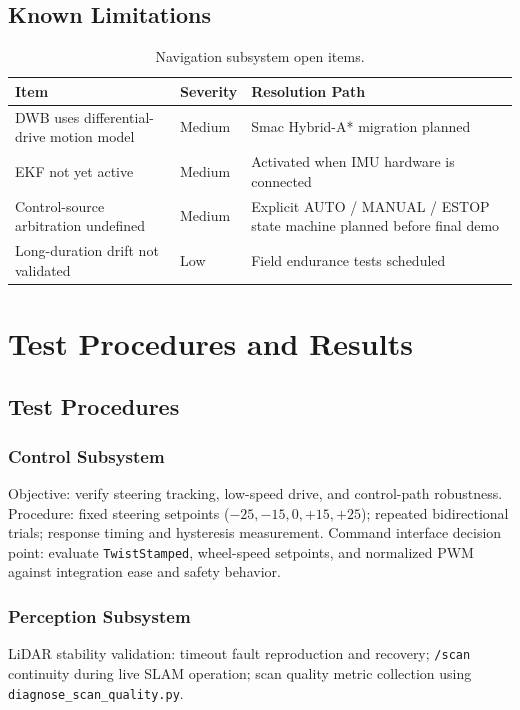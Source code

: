 \documentclass[12pt,a4paper]{report}
\begin{document}
\section{Known Limitations}

\begin{table}[H]
\centering
\caption{Navigation subsystem open items.}
\label{tab:nav_limits}
\begin{tabularx}{\textwidth}{|p{3.8cm}|p{1.4cm}|X|}
\hline
\textbf{Item} & \textbf{Severity} & \textbf{Resolution Path} \\
\hline
DWB uses differential-drive motion model & Medium & Smac Hybrid-A* migration planned \\
\hline
EKF not yet active & Medium & Activated when IMU hardware is connected \\
\hline
Control-source arbitration undefined & Medium & Explicit AUTO / MANUAL / ESTOP state machine planned before final demo \\
\hline
Long-duration drift not validated & Low & Field endurance tests scheduled \\
\hline
\end{tabularx}
\end{table}

\chapter{Test Procedures and Results}

\section{Test Procedures}

\subsection{Control Subsystem}
Objective: verify steering tracking, low-speed drive, and control-path robustness.\\
Procedure: fixed steering setpoints ($-25, -15, 0, +15, +25$\textdegree{}); repeated bidirectional trials; response timing and hysteresis measurement. Command interface decision point: evaluate \texttt{TwistStamped}, wheel-speed setpoints, and normalized PWM against integration ease and safety behavior.

\subsection{Perception Subsystem}
LiDAR stability validation: timeout fault reproduction and recovery; \texttt{/scan} continuity during live SLAM operation; scan quality metric collection using \texttt{diagnose\_scan\_quality.py}.
\end{document}
